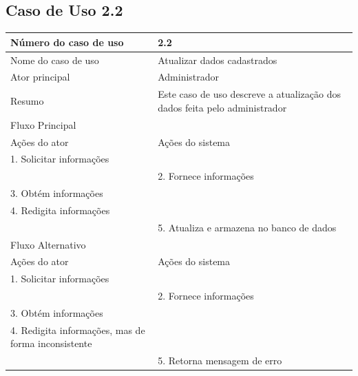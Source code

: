 \newpage

  \subsection{Caso de Uso 2.2}
    \begin{table}[h]
    \begin{center}
    \begin{tabular}{|p{5cm}|p{10cm}|}
      \hline
      Número do caso de uso & 2.2\\
      \hline
      Nome do caso de uso   & Atualizar dados cadastrados\\
      \hline
      Ator principal        & Administrador\\
      \hline
      Resumo                & Este caso de uso descreve a atualização dos dados feita pelo administrador\\
      \hline
      Fluxo Principal       & \\
      \hline
      Ações do ator         & Ações do sistema \\
      \hline
      1. Solicitar informações & \\
      \hline
      & 2. Fornece informações \\
      \hline
      3. Obtém informações & \\
      \hline
      4. Redigita informações & \\
      \hline
      & 5. Atualiza e armazena no banco de dados\\
      \hline
      Fluxo Alternativo & \\
      \hline
      Ações do ator & Ações do sistema\\
      \hline
      1. Solicitar informações & \\
      \hline
      & 2. Fornece informações \\
      \hline
      3. Obtém informações & \\
      \hline
      4. Redigita informações, mas de forma inconsistente & \\
      \hline
      & 5. Retorna mensagem de erro\\
      \hline      
    \end{tabular}
    \end{center}
    \end{table}



